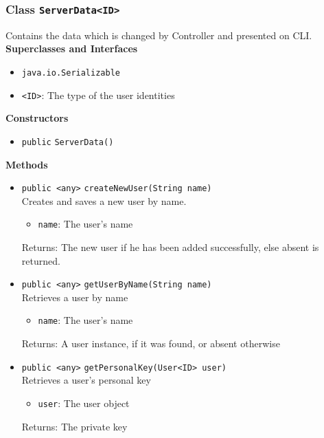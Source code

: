 \subsubsection{Class \lstinline|ServerData<ID>|}
Contains the data which is changed by Controller and presented on CLI. \\


\textbf{Superclasses and Interfaces}
\begin{itemize}
\item \lstinline|java.io.Serializable|
\end{itemize}

\begin{itemize}
\item \lstinline|<ID>|: The type of the user identities
\end{itemize}


\textbf{Constructors}
\begin{itemize}
\item \lstinline|public| \lstinline|ServerData|\lstinline|()|




\end{itemize}


\textbf{Methods}
\begin{itemize}
\item \lstinline|public <any>| \lstinline|createNewUser|\lstinline|(String name)|\\
Creates and saves a new user by name.
\begin{itemize}
\item \lstinline|name|: The user's name
\end{itemize}

Returns: The new user if he has been added successfully, else absent is returned.

\item \lstinline|public <any>| \lstinline|getUserByName|\lstinline|(String name)|\\
Retrieves a user by name
\begin{itemize}
\item \lstinline|name|: The user's name
\end{itemize}

Returns: A user instance, if it was found, or absent otherwise

\item \lstinline|public <any>| \lstinline|getPersonalKey|\lstinline|(User<ID> user)|\\
Retrieves a user's personal key
\begin{itemize}
\item \lstinline|user|: The user object
\end{itemize}

Returns: The private key

\end{itemize}

